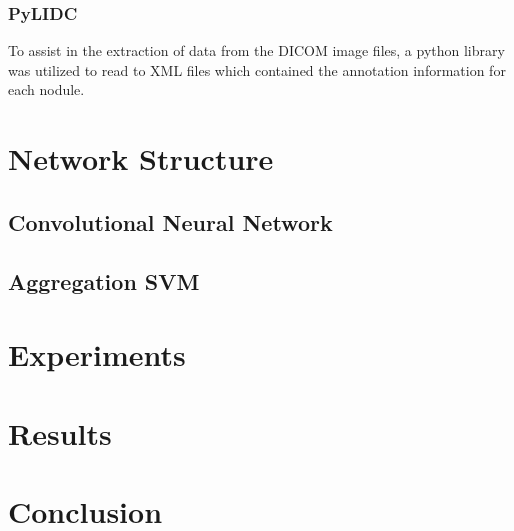 \documentclass[10pt,twocolumn,letterpaper]{article}
\begin{document}
      \subsubsection{PyLIDC} \label{data-lidc-pylidc}
         To assist in the extraction of data from the DICOM image files, a python library was utilized
         to read to XML files which contained the annotation information for each nodule. \cite{Hancock2018}

         \section{Network Structure} \label{struct}

   \subsection{Convolutional Neural Network} \label{struct-cnn}

   \subsection{Aggregation SVM} \label{struct-svm}

\section{Experiments} \label{experiments}

\section{Results} \label{results}

\section{Conclusion} \label{conclusion}

{\small


}
\end{document}
